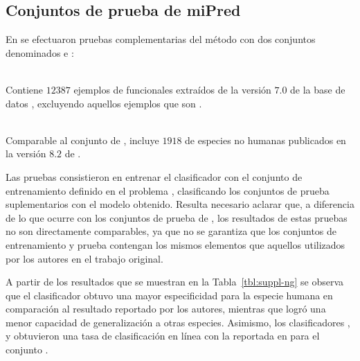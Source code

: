 %
%
\subsection{Conjuntos de prueba de miPred}
%
En \cite{ng} se efectuaron pruebas complementarias del método
\work\mipred{} con dos conjuntos denominados  e
:
%
\begin{description}
\item{}\\
  Contiene $12387$ ejemplos de  funcionales extraídos de la
  versión $7$.$0$ de la base de datos  \cite{rfam},
  excluyendo aquellos ejemplos que son .
\item{}\\
  Comparable al conjunto  de \cite{xue}, incluye
  $1918$  de especies no humanas publicados en la versión
  $8$.$2$ de \work{\mirbase}.
\end{description}
%
Las pruebas consistieron en entrenar el clasificador con el conjunto
de entrenamiento definido en el problema \prob\mipred{}, clasificando
los conjuntos de prueba suplementarios con el modelo obtenido.
Resulta necesario aclarar que, a diferencia de lo que ocurre con los
conjuntos de prueba de \work\tripletsvm{}, los resultados de estas
pruebas no son directamente comparables, ya que no se garantiza que
los conjuntos de entrenamiento y prueba contengan los mismos elementos
que aquellos utilizados por los autores en el trabajo original.

A partir de los resultados que se muestran en la
Tabla~\ref{tbl:suppl-ng} se observa que el clasificador 
obtuvo una mayor especificidad para la especie humana en comparación
al resultado reportado por los autores, mientras que logró una menor
capacidad de generalización a otras especies.
Asimismo, los clasificadores ,  y 
obtuvieron una tasa de clasificación en línea con la reportada en
\cite{ng} para el conjunto .
